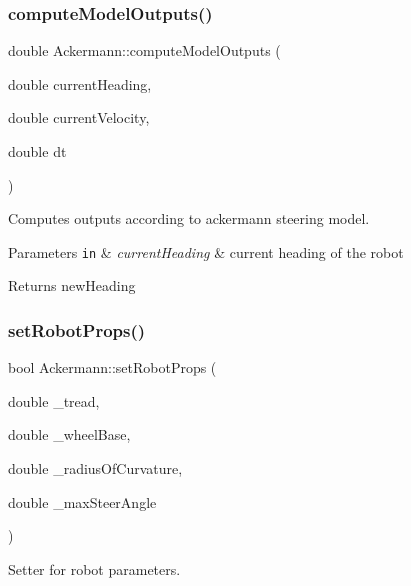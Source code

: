 \subsubsection{\texorpdfstring{compute\+Model\+Outputs()}{computeModelOutputs()}}
{\footnotesize\ttfamily double Ackermann\+::compute\+Model\+Outputs (\begin{DoxyParamCaption}\item[{double}]{current\+Heading,  }\item[{double}]{current\+Velocity,  }\item[{double}]{dt }\end{DoxyParamCaption})}



Computes outputs according to ackermann steering model. 


\begin{DoxyParams}[1]{Parameters}
\mbox{\tt in}  & {\em current\+Heading} & current heading of the robot \\
\hline
\end{DoxyParams}
\begin{DoxyReturn}{Returns}
new\+Heading 
\end{DoxyReturn}
\mbox{\label{classAckermann_a70edfb9472f629092736004586a5b3ce}} 
\subsubsection{\texorpdfstring{set\+Robot\+Props()}{setRobotProps()}}
{\footnotesize\ttfamily bool Ackermann\+::set\+Robot\+Props (\begin{DoxyParamCaption}\item[{double}]{\+\_\+tread,  }\item[{double}]{\+\_\+wheel\+Base,  }\item[{double}]{\+\_\+radius\+Of\+Curvature,  }\item[{double}]{\+\_\+max\+Steer\+Angle }\end{DoxyParamCaption})}



Setter for robot parameters. 


